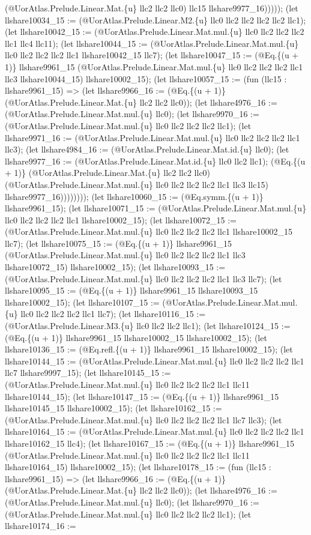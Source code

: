 \documentclass[11pt]{article}
\begin{document}
(@UorAtlas.Prelude.Linear.Mat.\{u\} llc2 llc2 llc0) llc15 llshare9977\_16))))); (let llshare10034\_15 := (@UorAtlas.Prelude.Linear.M2.\{u\} llc0 llc2 llc2 llc2 llc2 llc1); (let llshare10042\_15 := (@UorAtlas.Prelude.Linear.Mat.mul.\{u\} llc0 llc2 llc2 llc2 llc1 llc4 llc11); (let llshare10044\_15 := (@UorAtlas.Prelude.Linear.Mat.mul.\{u\} llc0 llc2 llc2 llc2 llc1 llshare10042\_15 llc7); (let llshare10047\_15 := (@Eq.\{(u + 1)\} llshare9961\_15 (@UorAtlas.Prelude.Linear.Mat.mul.\{u\} llc0 llc2 llc2 llc2 llc1 llc3 llshare10044\_15) llshare10002\_15); (let llshare10057\_15 := (fun (llc15 : llshare9961\_15) => (let llshare9966\_16 := (@Eq.\{(u + 1)\} (@UorAtlas.Prelude.Linear.Mat.\{u\} llc2 llc2 llc0)); (let llshare4976\_16 := (@UorAtlas.Prelude.Linear.Mat.mul.\{u\} llc0); (let llshare9970\_16 := (@UorAtlas.Prelude.Linear.Mat.mul.\{u\} llc0 llc2 llc2 llc2 llc1); (let llshare9971\_16 := (@UorAtlas.Prelude.Linear.Mat.mul.\{u\} llc0 llc2 llc2 llc2 llc1 llc3); (let llshare4984\_16 := (@UorAtlas.Prelude.Linear.Mat.id.\{u\} llc0); (let llshare9977\_16 := (@UorAtlas.Prelude.Linear.Mat.id.\{u\} llc0 llc2 llc1); (@Eq.\{(u + 1)\} (@UorAtlas.Prelude.Linear.Mat.\{u\} llc2 llc2 llc0) (@UorAtlas.Prelude.Linear.Mat.mul.\{u\} llc0 llc2 llc2 llc2 llc1 llc3 llc15) llshare9977\_16)))))))); (let llshare10060\_15 := (@Eq.symm.\{(u + 1)\} llshare9961\_15); (let llshare10071\_15 := (@UorAtlas.Prelude.Linear.Mat.mul.\{u\} llc0 llc2 llc2 llc2 llc1 llshare10002\_15); (let llshare10072\_15 := (@UorAtlas.Prelude.Linear.Mat.mul.\{u\} llc0 llc2 llc2 llc2 llc1 llshare10002\_15 llc7); (let llshare10075\_15 := (@Eq.\{(u + 1)\} llshare9961\_15 (@UorAtlas.Prelude.Linear.Mat.mul.\{u\} llc0 llc2 llc2 llc2 llc1 llc3 llshare10072\_15) llshare10002\_15); (let llshare10093\_15 := (@UorAtlas.Prelude.Linear.Mat.mul.\{u\} llc0 llc2 llc2 llc2 llc1 llc3 llc7); (let llshare10095\_15 := (@Eq.\{(u + 1)\} llshare9961\_15 llshare10093\_15 llshare10002\_15); (let llshare10107\_15 := (@UorAtlas.Prelude.Linear.Mat.mul.\{u\} llc0 llc2 llc2 llc2 llc1 llc7); (let llshare10116\_15 := (@UorAtlas.Prelude.Linear.M3.\{u\} llc0 llc2 llc2 llc1); (let llshare10124\_15 := (@Eq.\{(u + 1)\} llshare9961\_15 llshare10002\_15 llshare10002\_15); (let llshare10136\_15 := (@Eq.refl.\{(u + 1)\} llshare9961\_15 llshare10002\_15); (let llshare10144\_15 := (@UorAtlas.Prelude.Linear.Mat.mul.\{u\} llc0 llc2 llc2 llc2 llc1 llc7 llshare9997\_15); (let llshare10145\_15 := (@UorAtlas.Prelude.Linear.Mat.mul.\{u\} llc0 llc2 llc2 llc2 llc1 llc11 llshare10144\_15); (let llshare10147\_15 := (@Eq.\{(u + 1)\} llshare9961\_15 llshare10145\_15 llshare10002\_15); (let llshare10162\_15 := (@UorAtlas.Prelude.Linear.Mat.mul.\{u\} llc0 llc2 llc2 llc2 llc1 llc7 llc3); (let llshare10164\_15 := (@UorAtlas.Prelude.Linear.Mat.mul.\{u\} llc0 llc2 llc2 llc2 llc1 llshare10162\_15 llc4); (let llshare10167\_15 := (@Eq.\{(u + 1)\} llshare9961\_15 (@UorAtlas.Prelude.Linear.Mat.mul.\{u\} llc0 llc2 llc2 llc2 llc1 llc11 llshare10164\_15) llshare10002\_15); (let llshare10178\_15 := (fun (llc15 : llshare9961\_15) => (let llshare9966\_16 := (@Eq.\{(u + 1)\} (@UorAtlas.Prelude.Linear.Mat.\{u\} llc2 llc2 llc0)); (let llshare4976\_16 := (@UorAtlas.Prelude.Linear.Mat.mul.\{u\} llc0); (let llshare9970\_16 := (@UorAtlas.Prelude.Linear.Mat.mul.\{u\} llc0 llc2 llc2 llc2 llc1); (let llshare10174\_16 := 
\end{document}
